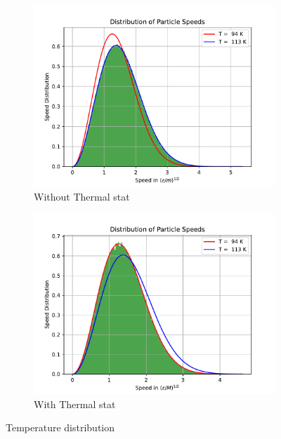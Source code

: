 \documentclass[a4paper]{article}
\begin{document}
\begin{figure}[h]
\centering
\captionsetup{justification=centering}
	\hfill
	\begin{subfigure}{0.4\linewidth}
\includegraphics[width=\textwidth]{Images/nopm.pdf}
		\caption{Without Thermal stat}
		\label{nopm}
	\end{subfigure}
	\hfill
	\begin{subfigure}{0.4\linewidth}
\includegraphics[width=\textwidth]{Images/pmtr=2.pdf}
		\caption{With Thermal stat}
		\label{pm}
	\end{subfigure}
\caption{Temperature distribution}
	\label{fig:Boltz}
\end{figure}
\end{document}
